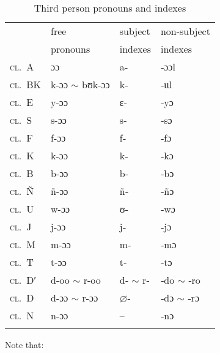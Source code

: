 \documentclass[output=paper]{langscibook}
\begin{document}
\begin{table}[ht]
  \centering
  \begin{tabular}{llll}
    \lsptoprule
    & {free} & {subject} & {non-subject} \\
    & {pronouns} & {indexes} & {indexes} \\
    \hline
    \textsc{cl.\ A} & {ɔɔ} & {a‑} & {‑ɔɔl} \\
    \textsc{cl.\ BK} & {k-ɔɔ $\sim$ bʊk-ɔɔ} & {k‑} & {‑ɩɩl} \\
    \textsc{cl.\ E} & {y-ɔɔ} & {ɛ‑} & {‑yɔ} \\
    \textsc{cl.\ S} & {s-ɔɔ} & {s‑} & {‑sɔ} \\
    \textsc{cl.\ F} & {f-ɔɔ} & {f‑} & {‑fɔ} \\
    \textsc{cl.\ K} & {k-ɔɔ} & {k‑} & {‑kɔ} \\
    \textsc{cl.\ B} & {b-ɔɔ} & {b‑} & {‑bɔ} \\
    \textsc{cl.\ Ñ} & {ñ-ɔɔ} & {ñ‑} & {‑ñɔ} \\
    \textsc{cl.\ U} & {w-ɔɔ} & {ʊ‑} & {‑wɔ} \\
    \textsc{cl.\ J} & {j-ɔɔ} & {j‑} & {‑jɔ} \\
    \textsc{cl.\ M} & {m-ɔɔ} & {m‑} & {‑mɔ} \\
    \textsc{cl.\ T} & {t-ɔɔ} & {t‑} & {‑tɔ} \\
    \textsc{cl.\ Dʹ} & {d-oo $\sim$ r-oo} & {d‑ $\sim$ r‑} & {‑do $\sim$ ‑ro} \\
    \textsc{cl.\ D} & {d-ɔɔ $\sim$ r-ɔɔ} & $\varnothing$‑ & {‑dɔ $\sim$ ‑rɔ} \\
    \textsc{cl.\ N} & {n-ɔɔ} & -- & {‑nɔ} \\
    \lspbottomrule
  \end{tabular}
  \caption{Third person pronouns and indexes}%
  \label{tab:Creissels:pronouns-3}
\end{table}

Note that:
\end{document}
